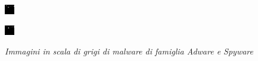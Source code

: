 \begin{figure}[ht]
    \centering
    \begin{minipage}{0.45\textwidth}
        \centering
        \includegraphics[width=0.9\linewidth]{images/adware.png}
        \label{fig:adware}
    \end{minipage}\hfill
    \begin{minipage}{0.45\textwidth}
        \centering
        \includegraphics[width=0.9\linewidth]{images/spyware.png}
        \label{fig:spyware}
    \end{minipage}
    \caption{\emph{Immagini in scala di grigi di malware di famiglia \textit{Adware} e \textit{Spyware}}}
\end{figure}

